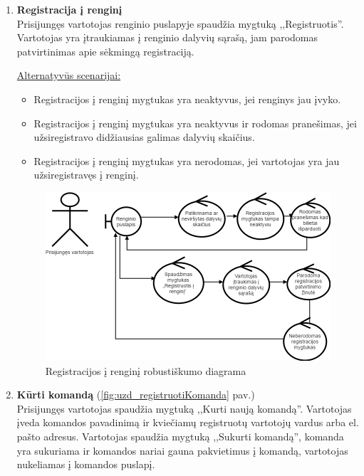 \documentclass{VUMIFPSkursinis}
\begin{document}
\begin{enumerate} [label = \textbf{U\arabic*.}]
			\item \textbf{Registracija į renginį} \\
					Prisijungęs vartotojas renginio puslapyje spaudžia mygtuką ,,Registruotis''. Vartotojas yra įtraukiamas į renginio dalyvių sąrašą, jam parodomas patvirtinimas apie sėkmingą registraciją.
					
				\underline{Alternatyvūs scenarijai:}
				\begin{itemize}
						\item Registracijos į renginį mygtukas yra neaktyvus, jei renginys jau įvyko.
						\item Registracijos į renginį mygtukas yra neaktyvus ir rodomas pranešimas, jei užsiregistravo didžiausias galimas dalyvių skaičius.
						\item Registracijos į renginį mygtukas yra nerodomas, jei vartotojas yra jau užsiregistravęs į renginį.
				\end{itemize}
				
				\begin{figure}[H]
					\centering
					\includegraphics[width=\textwidth]{img/PSI5/U9.png}
					\caption{Registracijos į renginį robustiškumo diagrama}
					\label{draw:u9}
				\end{figure}
				
			\item \textbf{Kūrti komandą} (\ref{fig:uzd_registruotiKomanda} pav.)\\
				Prisijungęs vartotojas  spaudžia mygtuką ,,Kurti naują komandą''. Vartotojas įveda komandos pavadinimą ir kviečiamų registruotų vartotojų vardus arba el. pašto adresus. Vartotojas spaudžia mygtuką ,,Sukurti komandą'', komanda yra sukuriama ir komandos nariai gauna pakvietimus į komandą, vartotojas nukeliamas į komandos puslapį.
			

\end{enumerate}
\end{document}
